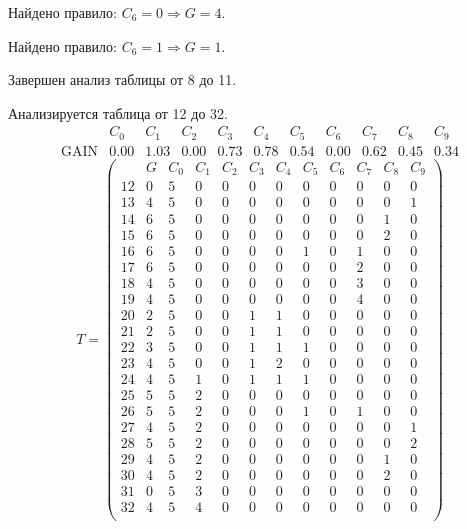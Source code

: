 Найдено правило: $C_{6} = 0 \Longrightarrow G = 4$.

Найдено правило: $C_{6} = 1 \Longrightarrow G = 1$.

Завершен анализ таблицы от 8 до 11.

Анализируется таблица от 12 до 32.
$$ 
\begin{array}{lc|c|cccccccc}
	  & C_{0} & C_{1} & C_{2} & C_{3} & C_{4} & C_{5} & C_{6} & C_{7} & C_{8} & C_{9}\\
 \textrm{GAIN} & 0.00 & 1.03 & 0.00 & 0.73 & 0.78 & 0.54 & 0.00 & 0.62 & 0.45 & 0.34
\end{array}
 $$
$$
T = \left( \begin{array}{lcc|c|cccccccc}
	 & G & C_{0} & C_{1} & C_{2} & C_{3} & C_{4} & C_{5} & C_{6} & C_{7} & C_{8} & C_{9}\\
	12 & 0 & 5 & 0 & 0 & 0 & 0 & 0 & 0 & 0 & 0 & 0\\
	13 & 4 & 5 & 0 & 0 & 0 & 0 & 0 & 0 & 0 & 0 & 1\\
	14 & 6 & 5 & 0 & 0 & 0 & 0 & 0 & 0 & 0 & 1 & 0\\
	15 & 6 & 5 & 0 & 0 & 0 & 0 & 0 & 0 & 0 & 2 & 0\\
	16 & 6 & 5 & 0 & 0 & 0 & 0 & 1 & 0 & 1 & 0 & 0\\
	17 & 6 & 5 & 0 & 0 & 0 & 0 & 0 & 0 & 2 & 0 & 0\\
	18 & 4 & 5 & 0 & 0 & 0 & 0 & 0 & 0 & 3 & 0 & 0\\
	19 & 4 & 5 & 0 & 0 & 0 & 0 & 0 & 0 & 4 & 0 & 0\\
	20 & 2 & 5 & 0 & 0 & 1 & 1 & 0 & 0 & 0 & 0 & 0\\
	21 & 2 & 5 & 0 & 0 & 1 & 1 & 0 & 0 & 0 & 0 & 0\\
	22 & 3 & 5 & 0 & 0 & 1 & 1 & 1 & 0 & 0 & 0 & 0\\
	23 & 4 & 5 & 0 & 0 & 1 & 2 & 0 & 0 & 0 & 0 & 0\\
	24 & 4 & 5 & 1 & 0 & 1 & 1 & 1 & 0 & 0 & 0 & 0\\
	25 & 5 & 5 & 2 & 0 & 0 & 0 & 0 & 0 & 0 & 0 & 0\\
	26 & 5 & 5 & 2 & 0 & 0 & 0 & 1 & 0 & 1 & 0 & 0\\
	27 & 4 & 5 & 2 & 0 & 0 & 0 & 0 & 0 & 0 & 0 & 1\\
	28 & 5 & 5 & 2 & 0 & 0 & 0 & 0 & 0 & 0 & 0 & 2\\
	29 & 4 & 5 & 2 & 0 & 0 & 0 & 0 & 0 & 0 & 1 & 0\\
	30 & 4 & 5 & 2 & 0 & 0 & 0 & 0 & 0 & 0 & 2 & 0\\
	31 & 0 & 5 & 3 & 0 & 0 & 0 & 0 & 0 & 0 & 0 & 0\\
	32 & 4 & 5 & 4 & 0 & 0 & 0 & 0 & 0 & 0 & 0 & 0\\
\end{array} \right)
$$

